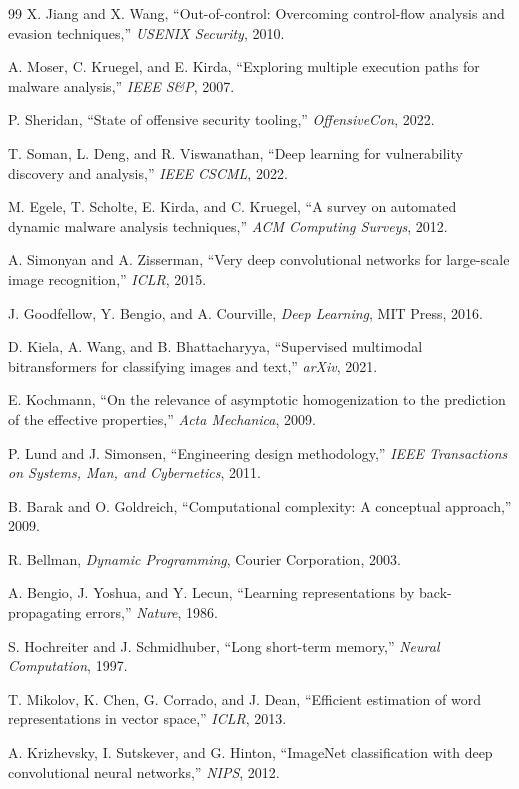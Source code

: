 \documentclass[10pt,conference,a4paper]{IEEEtran}
\begin{document}
\begin{thebibliography}{99}
 X. Jiang and X. Wang, ``Out-of-control: Overcoming control-flow analysis and evasion techniques,'' \textit{USENIX Security}, 2010.

 A. Moser, C. Kruegel, and E. Kirda, ``Exploring multiple execution paths for malware analysis,'' \textit{IEEE S\&P}, 2007.

 P. Sheridan, ``State of offensive security tooling,'' \textit{OffensiveCon}, 2022.

 T. Soman, L. Deng, and R. Viswanathan, ``Deep learning for vulnerability discovery and analysis,'' \textit{IEEE CSCML}, 2022.

 M. Egele, T. Scholte, E. Kirda, and C. Kruegel, ``A survey on automated dynamic malware analysis techniques,'' \textit{ACM Computing Surveys}, 2012.

 A. Simonyan and A. Zisserman, ``Very deep convolutional networks for large-scale image recognition,'' \textit{ICLR}, 2015.

 J. Goodfellow, Y. Bengio, and A. Courville, \textit{Deep Learning}, MIT Press, 2016.

 D. Kiela, A. Wang, and B. Bhattacharyya, ``Supervised multimodal bitransformers for classifying images and text,'' \textit{arXiv}, 2021.

 E. Kochmann, ``On the relevance of asymptotic homogenization to the prediction of the effective properties,'' \textit{Acta Mechanica}, 2009.

 P. Lund and J. Simonsen, ``Engineering design methodology,'' \textit{IEEE Transactions on Systems, Man, and Cybernetics}, 2011.

 B. Barak and O. Goldreich, ``Computational complexity: A conceptual approach,'' 2009.

 R. Bellman, \textit{Dynamic Programming}, Courier Corporation, 2003.

 A. Bengio, J. Yoshua, and Y. Lecun, ``Learning representations by back-propagating errors,'' \textit{Nature}, 1986.

 S. Hochreiter and J. Schmidhuber, ``Long short-term memory,'' \textit{Neural Computation}, 1997.

 T. Mikolov, K. Chen, G. Corrado, and J. Dean, ``Efficient estimation of word representations in vector space,'' \textit{ICLR}, 2013.

 A. Krizhevsky, I. Sutskever, and G. Hinton, ``ImageNet classification with deep convolutional neural networks,'' \textit{NIPS}, 2012.


\end{thebibliography}
\end{document}
